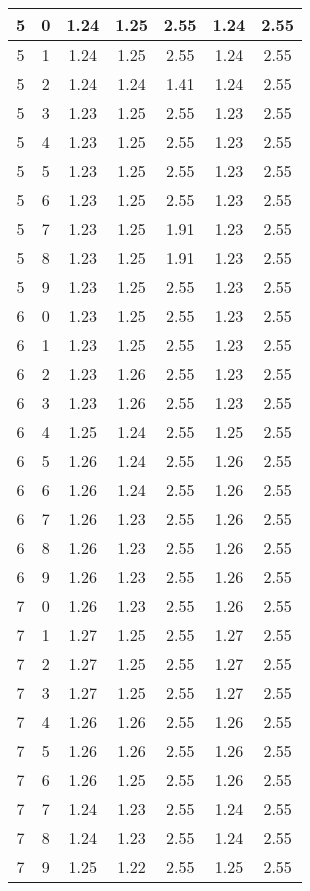 \begin{longtable}{|c|c||c||c|c||c|c|}
	5 & 0 & 1.24 & 1.25 & 2.55 & 1.24 & 2.55 \\ \hline
	5 & 1 & 1.24 & 1.25 & 2.55 & 1.24 & 2.55 \\ \hline
	5 & 2 & 1.24 & 1.24 & 1.41 & 1.24 & 2.55 \\ \hline
	5 & 3 & 1.23 & 1.25 & 2.55 & 1.23 & 2.55 \\ \hline
	5 & 4 & 1.23 & 1.25 & 2.55 & 1.23 & 2.55 \\ \hline
	5 & 5 & 1.23 & 1.25 & 2.55 & 1.23 & 2.55 \\ \hline
	5 & 6 & 1.23 & 1.25 & 2.55 & 1.23 & 2.55 \\ \hline
	5 & 7 & 1.23 & 1.25 & 1.91 & 1.23 & 2.55 \\ \hline
	5 & 8 & 1.23 & 1.25 & 1.91 & 1.23 & 2.55 \\ \hline
	5 & 9 & 1.23 & 1.25 & 2.55 & 1.23 & 2.55 \\ \hline
	6 & 0 & 1.23 & 1.25 & 2.55 & 1.23 & 2.55 \\ \hline
	6 & 1 & 1.23 & 1.25 & 2.55 & 1.23 & 2.55 \\ \hline
	6 & 2 & 1.23 & 1.26 & 2.55 & 1.23 & 2.55 \\ \hline
	6 & 3 & 1.23 & 1.26 & 2.55 & 1.23 & 2.55 \\ \hline
	6 & 4 & 1.25 & 1.24 & 2.55 & 1.25 & 2.55 \\ \hline
	6 & 5 & 1.26 & 1.24 & 2.55 & 1.26 & 2.55 \\ \hline
	6 & 6 & 1.26 & 1.24 & 2.55 & 1.26 & 2.55 \\ \hline
	6 & 7 & 1.26 & 1.23 & 2.55 & 1.26 & 2.55 \\ \hline
	6 & 8 & 1.26 & 1.23 & 2.55 & 1.26 & 2.55 \\ \hline
	6 & 9 & 1.26 & 1.23 & 2.55 & 1.26 & 2.55 \\ \hline
	7 & 0 & 1.26 & 1.23 & 2.55 & 1.26 & 2.55 \\ \hline
	7 & 1 & 1.27 & 1.25 & 2.55 & 1.27 & 2.55 \\ \hline
	7 & 2 & 1.27 & 1.25 & 2.55 & 1.27 & 2.55 \\ \hline
	7 & 3 & 1.27 & 1.25 & 2.55 & 1.27 & 2.55 \\ \hline
	7 & 4 & 1.26 & 1.26 & 2.55 & 1.26 & 2.55 \\ \hline
	7 & 5 & 1.26 & 1.26 & 2.55 & 1.26 & 2.55 \\ \hline
	7 & 6 & 1.26 & 1.25 & 2.55 & 1.26 & 2.55 \\ \hline
	7 & 7 & 1.24 & 1.23 & 2.55 & 1.24 & 2.55 \\ \hline
	7 & 8 & 1.24 & 1.23 & 2.55 & 1.24 & 2.55 \\ \hline
	7 & 9 & 1.25 & 1.22 & 2.55 & 1.25 & 2.55 \\ \hline
\end{longtable}

